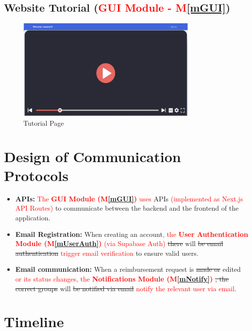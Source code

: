 \documentclass[12pt, titlepage]{article}
\newcommand{\mref}[1]{M\ref{#1}}
\begin{document}
\subsection{Website Tutorial (\textcolor{red}{GUI Module - \mref{mGUI}})}
\begin{figure}[H]
    \centering
    \includegraphics[width=0.8\textwidth]{img/tutorial.png}
    \caption{Tutorial Page}
    \label{fig:tutorial}
\end{figure}

\section{Design of Communication Protocols}

\begin{itemize}
  \item \textbf{APIs:} \textcolor{red}{The \textbf{GUI Module (\mref{mGUI})} uses} APIs \textcolor{red}{(implemented as Next.js API Routes)} to communicate between the backend and the frontend of the application.
  \item \textbf{Email Registration:} When creating an account\textcolor{red}{, the \textbf{User Authentication Module (\mref{mUserAuth})} (via Supabase Auth)} \sout{there} will \sout{be email authentication} \textcolor{red}{trigger email verification} to ensure valid users.
  \item \textbf{Email communication:} When a reimbursement request is \sout{made or} edited \textcolor{red}{or its status changes, the \textbf{Notifications Module (\mref{mNotify})}} \sout{, the correct groups} will \sout{be notified via email} \textcolor{red}{notify the relevant user via email}.
\end{itemize}

\section{Timeline}
\end{document}
